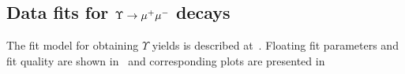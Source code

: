 \subsection{Data fits for \texorpdfstring{$\Upsilon \rightarrow \mu^+\mu^-$}{Y --> mu+mu-} decays}
\label{sec:upsilon:fits}

The fit model for obtaining $\Upsilon$ yields  is described
at~. Floating fit parameters and fit quality are shown
in~ and corresponding plots are presented
in~



